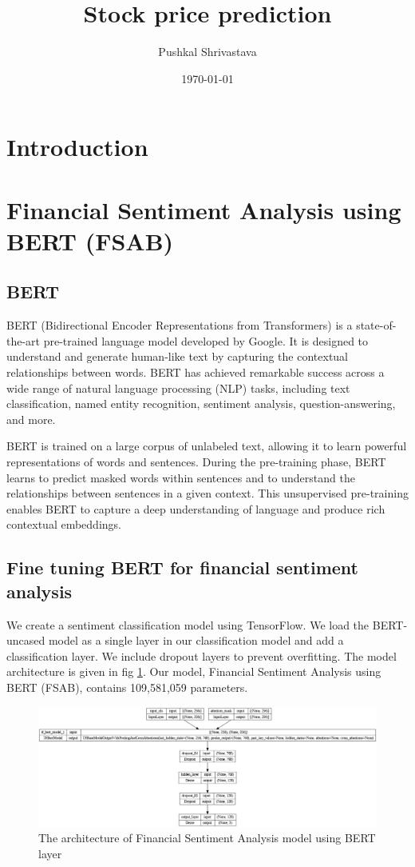 \documentclass[11pt]{article}
\title{Stock price prediction}
\author{Pushkal Shrivastava}
\date{\today}
\begin{document}
	\maketitle
	\tableofcontents



\section{Introduction}


\section{Financial Sentiment Analysis using BERT (FSAB)}\label{sec_FSAB}
\subsection{BERT}
BERT (Bidirectional Encoder Representations from Transformers) is a state-of-the-art pre-trained language model developed by Google. It is designed to understand and generate human-like text by capturing the contextual relationships between words. BERT has achieved remarkable success across a wide range of natural language processing (NLP) tasks, including text classification, named entity recognition, sentiment analysis, question-answering, and more.

BERT is trained on a large corpus of unlabeled text, allowing it to learn powerful representations of words and sentences. During the pre-training phase, BERT learns to predict masked words within sentences and to understand the relationships between sentences in a given context. This unsupervised pre-training enables BERT to capture a deep understanding of language and produce rich contextual embeddings.

\subsection{Fine tuning BERT for financial sentiment analysis}
We create a sentiment classification model using TensorFlow. We load the BERT-uncased model as a single layer in our classification model and add a classification layer. We include dropout layers to prevent overfitting. The model architecture is given in fig \ref{fig_FSAB}. Our model, Financial Sentiment Analysis using BERT (FSAB), contains 109,581,059 parameters. 
\begin{figure}[h]
	\includegraphics[width = \linewidth]{graphics/FSAB_model.png}
	\caption{The architecture of Financial Sentiment Analysis model using BERT layer}
	\label{fig_FSAB}
\end{figure}
\end{document}

